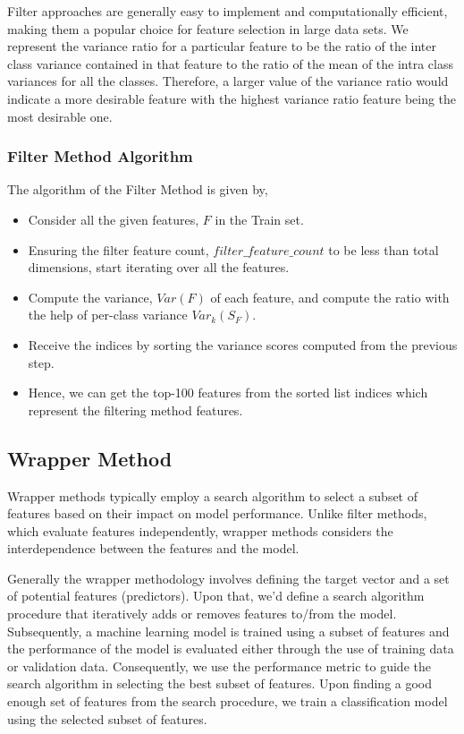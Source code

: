 \documentclass[12pt,twoside,a4paper]{article}
\begin{document}
Filter approaches are generally easy to implement and computationally efficient, making them a popular choice for feature selection in large data sets. We represent the variance ratio for a particular feature to be the ratio of the inter class variance contained in that feature to the ratio of the mean of the intra class variances for all the classes. Therefore, a larger value of the variance ratio would indicate a more desirable feature with the highest variance ratio feature being the most desirable one. \\

\subsubsection*{Filter Method Algorithm}
The algorithm of the Filter Method is given by,
\begin{itemize}
    \item Consider all the given features, $F$ in the Train set.
    \item Ensuring the filter feature count, $filter\_feature\_count$ to be less than total dimensions, start iterating over all the features.
    \item Compute the variance, $Var(F)$ of each feature, and compute the ratio with the help of per-class variance $Var_k(S_F)$.
    \item Receive the indices by sorting the variance scores computed from the previous step.
    \item Hence, we can get the top-100 features from the sorted list indices which represent the filtering method features.
\end{itemize}

\subsection{Wrapper Method}

Wrapper methods typically employ a search algorithm to select a subset of features based on their impact on model performance. Unlike filter methods, which evaluate features independently, wrapper methods considers the interdependence between the features and the model.

Generally the wrapper methodology involves defining the target vector and a set of potential features (predictors). Upon that, we'd define a search algorithm procedure that iteratively adds or removes features to/from the model. Subsequently, a machine learning model is trained using a subset of features and the performance of the model is evaluated either through the use of training data or validation data. Consequently, we use the performance metric to guide the search algorithm in selecting the best subset of features. Upon finding a good enough set of features from the search procedure, we train a classification model using the selected subset of features.
\end{document}
